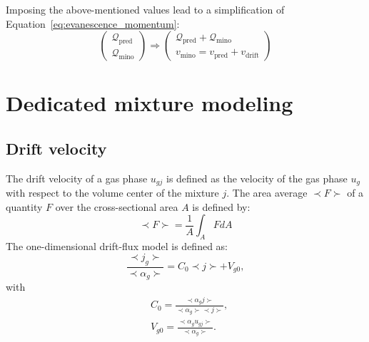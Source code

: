 Imposing the above-mentioned values lead to a simplification of Equation~\ref{eq:evanescence_momentum}:
\begin{equation}
\label{eq:evanescence_momentum_HEM}
\begin{pmatrix}
{\mathcal{Q}_{\text{pred}}} \\
{\mathcal{Q}_{\text{mino}}}
\end{pmatrix}
\Longrightarrow
\begin{pmatrix}
{\mathcal{Q}_{\text{pred}}} +  {\mathcal{Q}_{\text{mino}}} \\
{v_{\text{mino}} = v_{\text{pred}} + v_{\text{drift}}}
\end{pmatrix}
\end{equation} 

\section{Dedicated mixture modeling}\label{HEM:model}
\subsection{Drift velocity}\label{sec:phyical_modeling_drift_velocity}
The drift velocity of a gas phase $u_{gj}$ is defined as the velocity of the gas phase $u_g$ with respect to the volume center of the mixture $j$. The area average $\prec F\succ $ of a quantity $F$ over the cross-sectional area $ A$ is defined by: 
\begin{equation}
    \prec F\succ=\frac{1}{A}\int_A FdA
\end{equation}
The one-dimensional drift-flux model is defined as: 
\begin{equation}
    \frac{\prec j_g\succ}{\prec \alpha_g \succ}=C_0 \prec j\succ+V_{g0},
\end{equation}
with
\begin{align}
    &C_0 = \frac{\prec \alpha_g j \succ}{\prec \alpha_g \succ \prec  j \succ},\\
    &V_{g0} = \frac{\prec \alpha_g u_{gj} \succ}{\prec \alpha_g \succ}.
\end{align}

